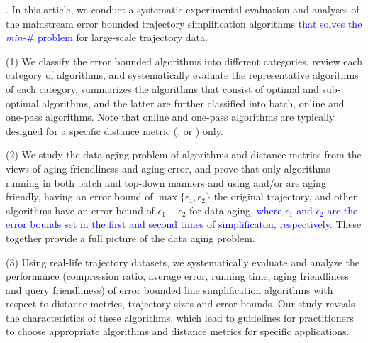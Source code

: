 {%



.
In this article, we conduct a systematic experimental evaluation and analyses of the mainstream error bounded trajectory simplification algorithms \textcolor{blue}{that solves the \emph{min-$\#$} problem} for large-scale trajectory data.

\stab (1) We classify the error bounded \lsa algorithms into different categories, review each category of algorithms, and systematically evaluate the representative algorithms of each category.
%
 summarizes the algorithms that consist of optimal and sub-optimal algorithms, and the latter are further classified into batch, online and one-pass algorithms.
Note that online and one-pass algorithms are typically designed for a specific distance metric  (\ped, \sed or \dad) only.

\stab (2) {We study the data aging problem of \lsa algorithms and distance metrics from the views of aging friendliness and aging error, and prove that only algorithms running in both batch and top-down manners and using \ped and/or \sed are aging friendly, having an error bound of $\max{\{\epsilon_1, \epsilon_2\}}$ \wrt the original trajectory, and other algorithms have an error bound of ${\epsilon_1+\epsilon_2}$ for data aging, \textcolor{blue}{where $\epsilon_1$ and $\epsilon_2$ are the error bounds set in the first and second times of simplificaton, respectively}.  These together provide a full picture of the data aging problem.}

\stab (3) Using real-life trajectory datasets, we systematically evaluate and analyze the performance (compression ratio, average error, running time, {aging friendliness and query friendliness}) of error bounded line simplification algorithms with respect to {distance metrics,} trajectory sizes and error bounds.
Our study reveals the characteristics of these algorithms, which lead to guidelines for practitioners to choose appropriate algorithms and distance metrics for specific applications.


}
